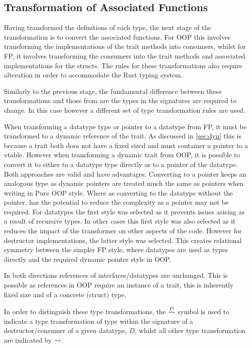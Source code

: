 \documentclass[ oneside,%
                    author={James Elgar},
                    degree={MEng},
                     title={Bidirectional transformer between functional and \\ object-oriented programming in Rust},
                  subtitle={}]{dissertation}
\begin{document}
\subsection{Transformation of Associated Functions}

Having transformed the definitions of each type, the next stage of the transformation is to convert the associated functions. For OOP this involves transforming the implementations of the trait methods into consumers, whilst for FP, it involves transforming the consumers into the trait methods and associated implementations for the structs. The rules for these transformations also require alteration in order to accommodate the Rust typing system.

Similarly to the previous stage, the fundamental difference between these transformations and those from \cite{food} are the types in the signatures are required to change. In this case however a different set of type transformation rules are used. 

When transforming a datatype type or pointer to a datatype from FP, it must be transformed to a dynamic reference of the trait. As discussed in \autoref{sec:dyn} this is because a trait both does not have a fixed sized and must container a pointer to a vtable. However when transforming a dynamic trait from OOP, it is possible to convert it to either to a datatype type directly or to a pointer of the datatype. Both approaches are valid and have advantages. Converting to a pointer keeps an analogous type as dynamic pointers are treated much the same as pointers when writing in Pure OOP style. Where as converting to the datatype without the pointer, has the potential to reduce the complexity as a pointer may not be required. For datatypes the first style was selected as it prevents issues arising as a result of recursive types. In other cases this first style was also selected as it reduces the impact of the transformer on other aspects of the code. However for destructor implementations, the latter style was selected. This creates relational symmetry between the simpler FP style, where datatypes are used as types directly and the required dynamic pointer style in OOP.

In both directions references of interfaces/datatypes are unchanged. This is possible as references in OOP require an instance of a trait, this is inherently fixed size and of a concrete (struct) type.

In order to distinguish these type transformations, the $\overset{D}{\leadsto}$ symbol is used to indicate a type transformation of type within the signature of a destructor/consumer of a given datatype, $D$, whilst all other type transformation are indicated by $\overset{}{\leadsto}$.
\end{document}
